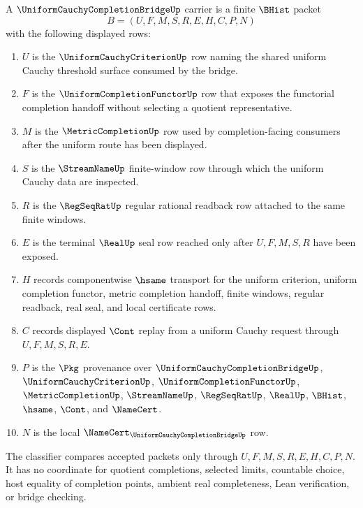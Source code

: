\begin{definition}
\label{def:uniform-cauchy-completion-bridge-carrier}
A $\UniformCauchyCompletionBridgeUp$ carrier is a finite $\BHist$ packet
$$
B=(U,F,M,S,R,E,H,C,P,N)
$$
with the following displayed rows:
\begin{enumerate}
\item $U$ is the $\UniformCauchyCriterionUp$ row naming the shared uniform Cauchy threshold surface consumed by the bridge.
\item $F$ is the $\UniformCompletionFunctorUp$ row that exposes the functorial completion handoff without selecting a quotient representative.
\item $M$ is the $\MetricCompletionUp$ row used by completion-facing consumers after the uniform route has been displayed.
\item $S$ is the $\StreamNameUp$ finite-window row through which the uniform Cauchy data are inspected.
\item $R$ is the $\RegSeqRatUp$ regular rational readback row attached to the same finite windows.
\item $E$ is the terminal $\RealUp$ seal row reached only after $U,F,M,S,R$ have been exposed.
\item $H$ records componentwise $\hsame$ transport for the uniform criterion, uniform completion functor, metric completion handoff, finite windows, regular readback, real seal, and local certificate rows.
\item $C$ records displayed $\Cont$ replay from a uniform Cauchy request through $U,F,M,S,R,E$.
\item $P$ is the $\Pkg$ provenance over $\UniformCauchyCompletionBridgeUp$, $\UniformCauchyCriterionUp$, $\UniformCompletionFunctorUp$, $\MetricCompletionUp$, $\StreamNameUp$, $\RegSeqRatUp$, $\RealUp$, $\BHist$, $\hsame$, $\Cont$, and $\NameCert$.
\item $N$ is the local $\NameCert_{\UniformCauchyCompletionBridgeUp}$ row.
\end{enumerate}
The classifier compares accepted packets only through $U,F,M,S,R,E,H,C,P,N$. It has no coordinate for quotient completions, selected limits, countable choice, host equality of completion points, ambient real completeness, Lean verification, or bridge checking.
\end{definition}

